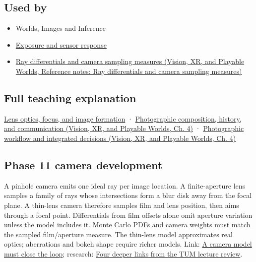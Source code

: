 \subsection{Used by}\label{appendix-21f8456e2629-used-by}

\hypertarget{appendix-21f8456e2629-used-by}{}

\begin{itemize}
\item
  {Worlds, Images and Inference}
\item
  \hyperref[appendix-92d45cdf2afc]{Exposure and sensor response}
\item
  \href{../07-Vision-XR-and-Playable-Worlds/main.pdf\#nameddest=appendix-8c40fad29462}{Ray differentials and camera sampling measures (Vision, XR, and Playable Worlds, Reference notes: Ray differentials and camera sampling measures)}
\end{itemize}

\subsection{Full teaching explanation}\label{appendix-21f8456e2629-full-teaching-explanation}

\hypertarget{appendix-21f8456e2629-full-teaching-explanation}{}

\hyperref[03-visual-computing-i-ch003-lens-optics-focus-and-image-formation]{Lens optics, focus, and image formation} · \href{../07-Vision-XR-and-Playable-Worlds/main.pdf\#nameddest=04-visual-computing-ii-ch034-photographic-composition-history-and-communication}{Photographic composition, history, and communication (Vision, XR, and Playable Worlds, Ch. 4)} · \href{../07-Vision-XR-and-Playable-Worlds/main.pdf\#nameddest=04-visual-computing-ii-ch034-photographic-workflow-and-integrated-decisions}{Photographic workflow and integrated decisions (Vision, XR, and Playable Worlds, Ch. 4)}

\subsection{Phase 11 camera development}\label{appendix-21f8456e2629-phase-11-camera-development}

\hypertarget{appendix-21f8456e2629-phase-11-camera-development}{}

A pinhole camera emits one ideal ray per image location. A finite-aperture lens samples a family of rays whose intersections form a blur disk away from the focal plane. A thin-lens camera therefore samples film and lens position, then aims through a focal point. Differentials from film offsets alone omit aperture variation unless the model includes it. Monte Carlo PDFs and camera weights must match the sampled film/aperture measure. The thin-lens model approximates real optics; aberrations and bokeh shape require richer models. Link: \hyperref[02-foundations-ii-ch037-a-camera-model-must-close-the-loop]{A camera model must close the loop}; research: \hyperref[02-foundations-ii-ch036-four-deeper-links-from-the-tum-lecture-review]{Four deeper links from the TUM lecture review}.
